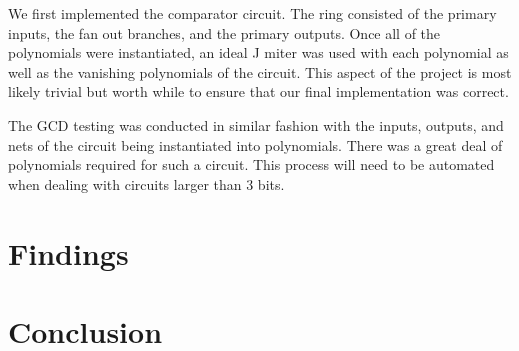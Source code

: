 \documentclass[12pt]{report}
\begin{document}
We first implemented the comparator circuit. The ring consisted of the primary inputs, the fan out branches, and the primary outputs. Once all of the polynomials were instantiated, an ideal J miter was used with each polynomial as well as the vanishing polynomials of the circuit. This aspect of the project is most likely trivial but worth while to ensure that our final implementation was correct. 

The GCD testing was conducted in similar fashion with the inputs, outputs, and nets of the circuit being instantiated into polynomials. There was a great deal of polynomials required for such a circuit. This process will need to be automated when dealing with circuits larger than 3 bits.

\section{Findings}

\section{Conclusion}



%
\end{document}
